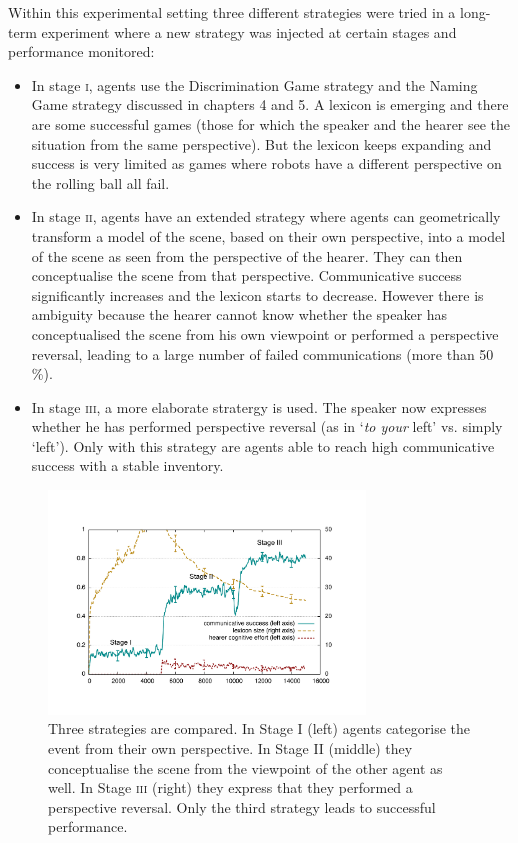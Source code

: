 Within this experimental setting three different strategies were tried in a long-term experiment where
a new strategy was injected at certain stages and performance monitored: 
\begin{itemize}
\item In stage \textsc{i}, agents use 
the Discrimination Game strategy and the Naming Game strategy discussed in chapters 4 and 5. A 
lexicon is emerging and there are some successful games (those for which the speaker and the hearer see the situation from 
the same perspective). But the lexicon keeps expanding and success is very limited as games where robots have a different 
perspective on the rolling ball all fail. 
\item In stage \textsc{ii}, agents have an extended 
strategy where agents can geometrically transform a model of the scene, based on their own perspective, into a model of the scene 
as seen from the perspective of the hearer. They can then conceptualise the scene from that perspective. 
Communicative success significantly increases and the 
lexicon starts to decrease. However there is ambiguity because the hearer cannot know whether
the speaker has conceptualised the 
scene from his own viewpoint or performed a perspective reversal, leading to a large number of failed communications 
(more than 50 \%). 
\item In stage \textsc{iii}, a more elaborate stratergy is used. The speaker now expresses whether he has performed perspective 
reversal (as in `{\itshape to your} left' vs. simply `left'). Only with this strategy are agents able to reach high 
communicative success with a stable inventory. 
\end{itemize}


\begin{figure}[p]
\centerline{
\includegraphics[width=0.75\textwidth]{chap10/figs/stages.pdf}}
\caption{\label{fig:stages}Three strategies are compared. In Stage I (left) agents categorise the event from their 
own perspective. In Stage II (middle) they conceptualise the scene from the viewpoint of the other agent as well. In Stage \textsc{iii} (right) 
they express that they performed a perspective reversal. Only the third strategy leads to successful performance.} 
\end{figure}

